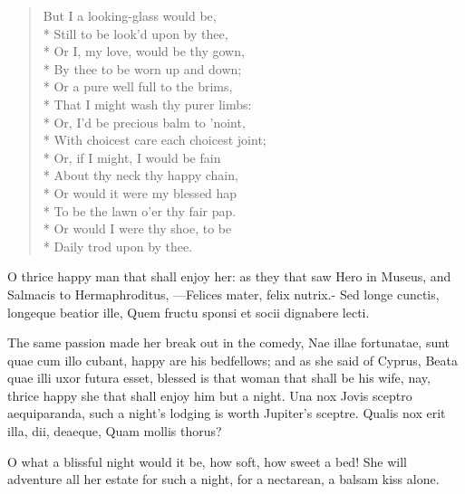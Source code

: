 {
\begin{verse}
But I a looking-glass would be,\\*
Still to be look'd upon by thee,\\*
Or I, my love, would be thy gown,\\*
By thee to be worn up and down;\\*
Or a pure well full to the brims,\\*
That I might wash thy purer limbs:\\*
Or, I'd be precious balm to 'noint,\\*
With choicest care each choicest joint;\\*
Or, if I might, I would be fain\\*
About thy neck thy happy chain,\\*
Or would it were my blessed hap\\*
To be the lawn o'er thy fair pap.\\*
Or would I were thy shoe, to be\\*
Daily trod upon by thee.
\end{verse}

O thrice happy man that shall enjoy her: as they that saw Hero in
Museus, and Salmacis to Hermaphroditus,
---Felices mater, \etc{} felix nutrix.-
Sed longe cunctis, longeque beatior ille,
Quem fructu sponsi et socii dignabere lecti.

The same passion made her break out in the comedy, Nae illae
fortunatae, sunt quae cum illo cubant, happy are his bedfellows; and as
she said of Cyprus, Beata quae illi uxor futura esset, blessed is
that woman that shall be his wife, nay, thrice happy she that shall
enjoy him but a night. Una nox Jovis sceptro aequiparanda, such a
night's lodging is worth Jupiter's sceptre.
Qualis nox erit illa, dii, deaeque,
Quam mollis thorus?

O what a blissful night would it be, how soft, how sweet a bed! She
will adventure all her estate for such a night, for a nectarean, a
balsam kiss alone.

}
